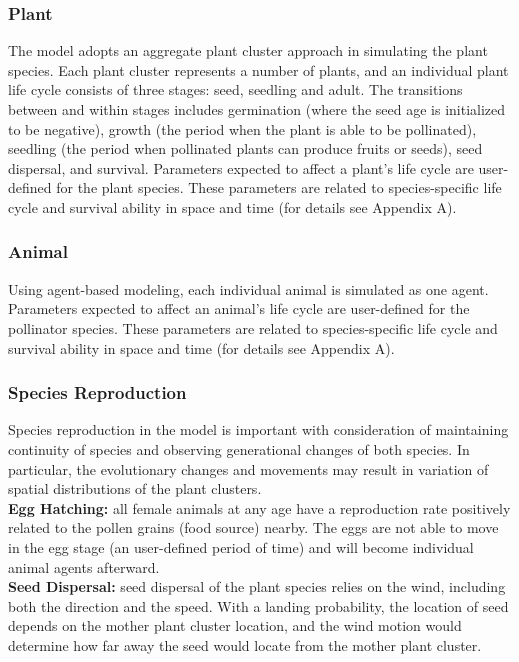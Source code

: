 \documentclass[3p,,preprint,12pt]{elsarticle}
\begin{document}
\subsubsection{Plant}
The model adopts an aggregate plant cluster approach in simulating the plant species. Each plant cluster represents a number of plants, and an individual plant life cycle consists of three stages: seed, seedling and adult. The transitions between and within stages includes germination (where the seed age is initialized to be negative), growth (the period when the plant is able to be pollinated), seedling (the period when pollinated plants can produce fruits or seeds), seed dispersal, and survival. Parameters expected to affect a plant’s life cycle are user-defined for the plant species. These parameters are related to species-specific life cycle and survival ability in space and time (for details see Appendix A).

\subsubsection{Animal}
Using agent-based modeling, each individual animal is simulated as one agent. Parameters expected to affect an animal’s life cycle are user-defined for the pollinator species. These parameters are related to species-specific life cycle and survival ability in space and time (for details see Appendix A).

\subsubsection{Species Reproduction}
Species reproduction in the model is important with consideration of maintaining continuity of species and observing generational changes of both species. In particular, the evolutionary changes and movements may result in variation of spatial distributions of the plant clusters. \\

\noindent\textbf{Egg Hatching:} all female animals at any age have a reproduction rate positively related to the pollen grains (food source) nearby. The eggs are not able to move in the egg stage (an user-defined period of time) and will become individual animal agents afterward. \\

\noindent\textbf{Seed Dispersal:} seed dispersal of the plant species relies on the wind, including both the direction and the speed. With a landing probability, the location of seed depends on the mother plant cluster location, and the wind motion would determine how far away the seed would locate from the mother plant cluster.
\end{document}
